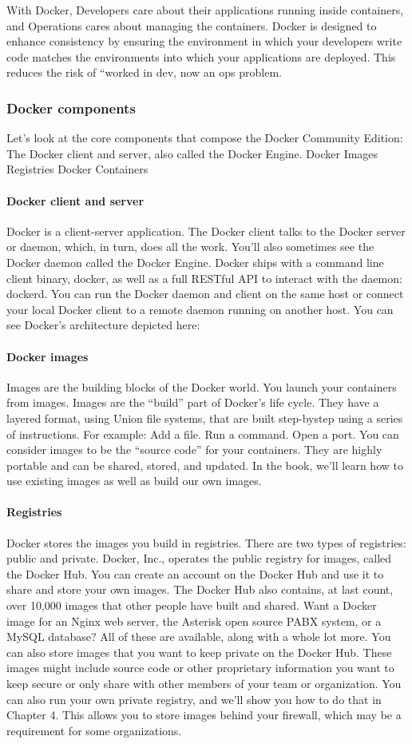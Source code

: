 With Docker, Developers care about their applications running inside
containers, and Operations cares about managing the containers. Docker is
designed to enhance consistency by ensuring the environment in which
your developers write code matches the environments into which your
applications are deployed. This reduces the risk of “worked in dev, now an
ops problem.
\subsubsection{Docker components}
Let’s look at the core components that compose the Docker Community
Edition:
The Docker client and server, also called the Docker Engine.
Docker Images
Registries
Docker Containers
\paragraph{Docker client and server}
Docker is a client-server application. The Docker client talks to the Docker
server or daemon, which, in turn, does all the work. You’ll also sometimes
see the Docker daemon called the Docker Engine. Docker ships with a
command line client binary, docker, as well as a full RESTful API to
interact with the daemon: dockerd. You can run the Docker daemon and
client on the same host or connect your local Docker client to a remote
daemon running on another host. You can see Docker’s architecture
depicted here:
\paragraph{Docker images}
Images are the building blocks of the Docker world. You launch your
containers from images. Images are the “build” part of Docker’s life cycle.
They have a layered format, using Union file systems, that are built step-bystep using a series of instructions. For example:
Add a file.
Run a command.
Open a port.
You can consider images to be the “source code” for your containers. They
are highly portable and can be shared, stored, and updated. In the book,
we’ll learn how to use existing images as well as build our own images.
\paragraph{Registries}
Docker stores the images you build in registries. There are two types of
registries: public and private. Docker, Inc., operates the public registry for
images, called the Docker Hub. You can create an account on the Docker
Hub and use it to share and store your own images.
The Docker Hub also contains, at last count, over 10,000 images that other
people have built and shared. Want a Docker image for an Nginx web
server, the Asterisk open source PABX system, or a MySQL database? All
of these are available, along with a whole lot more.
You can also store images that you want to keep private on the Docker Hub.
These images might include source code or other proprietary information
you want to keep secure or only share with other members of your team or
organization.
You can also run your own private registry, and we’ll show you how to do
that in Chapter 4. This allows you to store images behind your firewall,
which may be a requirement for some organizations.
